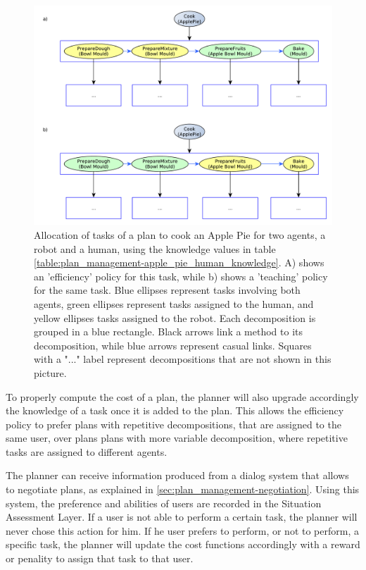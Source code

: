 \begin{figure}[ht!]
 \centering
  \includegraphics[scale=0.5]{img/plan_management/adapting_plan_knowledge.pdf}
 \caption{Allocation of tasks of a plan to cook an Apple Pie for two agents, a robot and a human, using the knowledge values in table \ref{table:plan_management-apple_pie_human_knowledge}. A) shows an 'efficiency' policy for this task, while b) shows a 'teaching' policy for the same task. Blue ellipses represent tasks involving both agents, green ellipses represent tasks assigned to the human, and yellow ellipses tasks assigned to the robot. Each decomposition is grouped in a blue rectangle. Black arrows link a method to its decomposition, while blue arrows represent casual links. Squares with a "..." label represent decompositions that are not shown in this picture.}
 \label{fig:plan_management-adapting_plan_knowledge}
 \end{figure}



To properly compute the cost of a plan, the planner will also upgrade accordingly the knowledge of a task once it is added to the plan. This allows the efficiency policy to prefer plans with repetitive decompositions, that are assigned to the same user, over plans plans with more variable decomposition, where repetitive tasks are assigned to different agents.

The planner can receive information produced from a dialog system that allows to negotiate plans, as explained in \ref{sec:plan_management-negotiation}. Using this system, the preference and abilities of users are recorded in the Situation Assessment Layer. 
If a user is not able to perform a certain task, the planner will never chose this action for him. If he user prefers to perform, or not to perform, a specific task, the planner will update the cost functions accordingly with a reward or penality to assign that task to that user.

